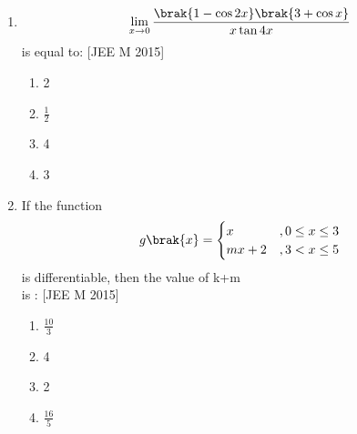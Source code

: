 \documentclass[journal,12pt,onecolumn]{IEEEtran}
\theoremstyle{remark}
\begin{document}
\begin{enumerate}
    \item \[ \lim_{x \to 0} \frac{\brak{1-\cos2x}\brak{3+\cos x}}{x\tan4x} \]is equal to: \hfill[JEE M 2015]
     \begin{multicols}{4}
        \begin{enumerate}
     \item 2 \item$\frac{1}{2}$ \item4 \item3 
        \end{enumerate} 
     \end{multicols}
    \item If the function
     \[ g\brak{x} = \begin{cases}
  x & \text{$, 0\leq x\leq3 $}\\
  mx+2 & \text{$, 3<x\leq5 $}
  \end{cases}
  \]
    is differentiable, then the value of k+m \\is : \hfill[JEE M 2015]
     \begin{multicols}{4}
       \begin{enumerate}  
     \item $\frac{10}{3}$ \item 4 \item 2 \item $\frac{16}{5}$
     \end{enumerate}  
     \end{multicols}
     
\end{enumerate}    
\end{document}
